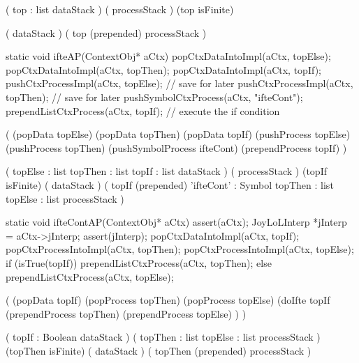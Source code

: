 \starttyping

\startWord[interpret]

\preDataStack
  (
    top : list
    dataStack
  )
\preProcessStack
  (
    processStack
  )
\preConditions
  (top isFinite)
\stopPreStack

\postDataStack
  (
    dataStack
  )
\postProcessStack
  (
    top (prepended)
    processStack
  )
\postConditions
\stopPostStack

\stopWord

\stoptyping

\startJoyLoLWord[ifte]

\startCCode
static void ifteAP(ContextObj* aCtx) {
  popCtxDataIntoImpl(aCtx, topElse);
  popCtxDataIntoImpl(aCtx, topThen);
  popCtxDataIntoImpl(aCtx, topIf);
  pushCtxProcessImpl(aCtx, topElse); // save for later
  pushCtxProcessImpl(aCtx, topThen); // save for later
  pushSymbolCtxProcess(aCtx, "ifteCont");
  prependListCtxProcess(aCtx, topIf); // execute the if condition
}
\stopCCode

\startImplementation[ansic]
  (
    (popData topElse)
    (popData topThen)
    (popData topIf)
    (pushProcess topElse)
    (pushProcess topThen)
    (pushSymbolProcess ifteCont)
    (prependProcess topIf)
  )
\stopImplementation

\startRule[ifte]
\preDataStack
  (
    topElse : list
    topThen : list
    topIf   : list
    dataStack
  )
\preProcessStack
  (
    processStack
  )
\preConditions
  (topIf isFinite)
\postDataStack
  (
    dataStack
  )
\postProcessStack
  (
    topIf (prepended)
    'ifteCont' : Symbol
    topThen    : list
    topElse    : list
    processStack
  )
\postConditions
\stopRule

\stopJoyLoLWord

\startJoyLoLWord[ifteCont]

\startCCode
static void ifteContAP(ContextObj* aCtx) {
  assert(aCtx);
  JoyLoLInterp *jInterp = aCtx->jInterp;
  assert(jInterp);
  popCtxDataIntoImpl(aCtx, topIf);
  popCtxProcessIntoImpl(aCtx, topThen);
  popCtxProcessIntoImpl(aCtx, topElse);
  if (isTrue(topIf)) {
    prependListCtxProcess(aCtx, topThen);
  } else {
    prependListCtxProcess(aCtx, topElse);
  }
}
\stopCCode

\startImplementation[ansic]
  (
    (popData topIf)
    (popProcess topThen)
    (popProcess topElse)
    (doIfte topIf 
      (prependProcess topThen)
      (prependProcess topElse)
    )
  )
\stopImplementation

\preDataStack
  (
    topIf : Boolean
    dataStack
  )
\preProcessStack
  (
    topThen : list
    topElse : list
    processStack
  )
\preConditions
  (topThen isFinite)
\postDataStack
  (
    dataStack
  )
\postProcessStack
  (
    topThen (prepended)
    processStack
  )
\postConditions
\stopRule

